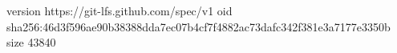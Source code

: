 version https://git-lfs.github.com/spec/v1
oid sha256:46d3f596ae90b38388dda7ec07b4cf7f4882ac73dafc342f381e3a7177e3350b
size 43840
